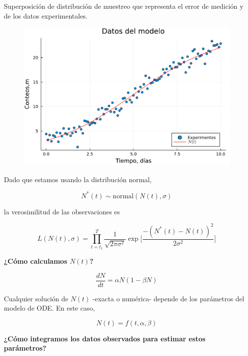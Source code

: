 \documentclass[11pt]{beamer}
\begin{document}
\begin{frame}

Superposición de distribución de muestreo que representa el error de medición y de los datos experimentales.

	\begin{figure}
		\includegraphics[scale=0.5]{images/bacterias_modelo_experimentos.pdf}
	\end{figure}
\end{frame}

\begin{frame}
Dado que estamos usando la distribución normal,

\[N^*(t) \sim \text{normal}(N(t),\sigma)\]

la verosimilitud de las observaciones es

\[L(N(t),\sigma) = \prod_{t=t_1}^T  \dfrac{1}{\sqrt{2\pi\sigma^2}} \exp{\Big[  \dfrac{-(N^*(t)-N(t))^2}{2\sigma^2}\Big]}\]

\begin{center}
	\textbf{¿Cómo calculamos $N(t)$?}
\end{center}

		\[\dfrac{dN}{dt} = \alpha N (1-\beta N)\]

\end{frame}

\begin{frame}

Cualquier solución de $N(t)$ -exacta o numérica- depende de los parámetros del modelo de ODE. En este caso,

\[N(t) = f(t,\alpha,\beta)\]

\begin{center}
	\textbf{¿Cómo integramos los datos observados para estimar estos parámetros?}
\end{center}

\end{frame}
\end{document}
